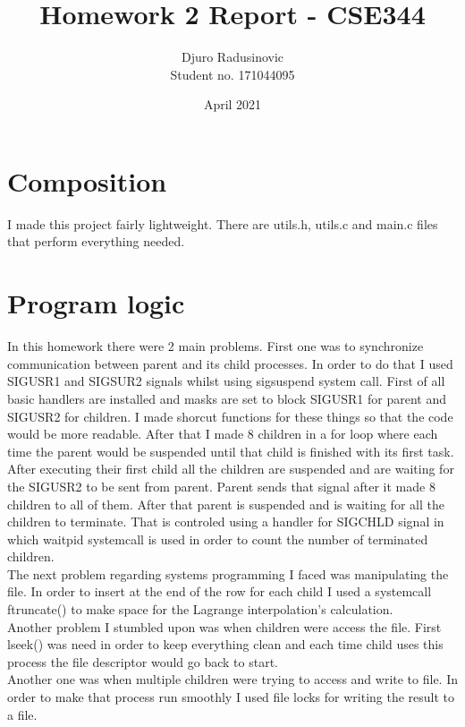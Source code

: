 \documentclass{article}
\title{Homework 2 Report - CSE344}
\author{Djuro Radusinovic \\ Student no. 171044095 }
\date{April 2021}
\begin{document}
\maketitle

\section{Composition}
I made this project fairly lightweight. There are utils.h, utils.c and main.c files that perform everything needed.\\

\section{Program logic}
In this homework there were 2 main problems. First one was to synchronize communication between parent and its child processes. In order to do that I used SIGUSR1 and SIGSUR2 signals whilst using sigsuspend system call. First of all basic handlers are installed and masks are set to block SIGUSR1 for parent and SIGUSR2 for children. I made shorcut functions for these things so that the code would be more readable. After that I made 8 children in a for loop where each time the parent would be suspended until that child is finished with its first task. After executing their first child all the children are suspended and are waiting for the SIGUSR2 to be sent from parent. Parent sends that signal after it made 8 children to all of them. After that parent is suspended and is waiting for all the children to terminate. That is controled using a handler for SIGCHLD signal in which waitpid systemcall is used in order to count the number of terminated children. \\
The next problem regarding systems programming I faced was manipulating the file. In order to insert at the end of the row for each child I used a systemcall ftruncate() to make space for the Lagrange interpolation's calculation. \\
Another problem I stumbled upon was when children were access the file. First lseek() was need in order to keep everything clean and each time child uses this process the file descriptor would go back to start.\\
Another one was when multiple children were trying to access and write to file. In order to make that process run smoothly I used file locks for writing the result to a file.
\end{document}
